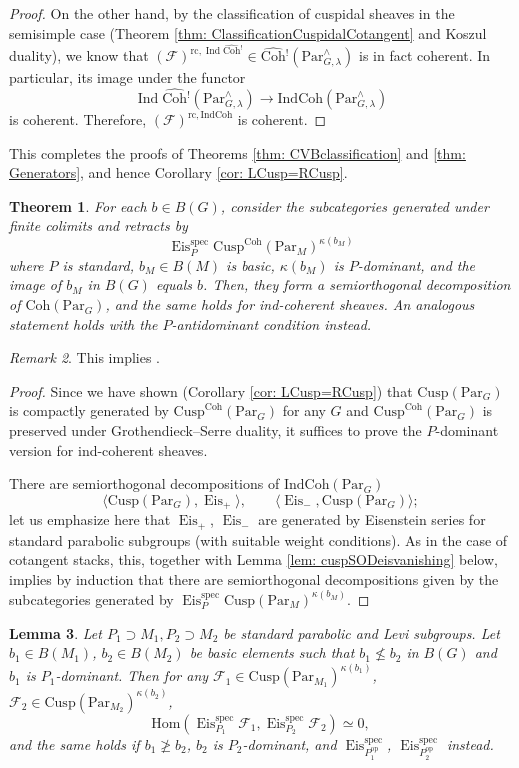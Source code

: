\documentclass{amsart}
\newtheorem{theorem}{Theorem}[subsection]
\newtheorem{lemma}[theorem]{Lemma}
\theoremstyle{definition}
\theoremstyle{remark}
\newtheorem{remark}[theorem]{Remark}
\numberwithin{equation}{section}
\DeclareMathOperator{\Ind}{Ind}
\newcommand{\mc}{\mathcal}
\newcommand{\Hom}{\mathrm{Hom}}
\newcommand{\spec}{\mathrm{spec}}
\newcommand{\op}{\mathrm{op}}
\newcommand{\wh}{\widehat}
\newcommand{\Par}{\mathrm{Par}}
\newcommand{\IndCoh}{\mathrm{IndCoh}}
\DeclareMathOperator{\Eis}{\mathrm{Eis}}
\newcommand{\Coh}{\mathrm{Coh}}
\newcommand{\Cusp}{\mathrm{Cusp}}
\newcommand{\rc}{\mathrm{rc}}
\begin{document}
\begin{proof}
On the other hand, by the classification of cuspidal sheaves in the semisimple case (Theorem \ref{thm: ClassificationCuspidalCotangent} and Koszul duality), we know that $(\mc F)^{\rc, \Ind\wh{\Coh}{}^!} \in \wh{\Coh}{}^! (\Par_{G,\lambda}^\wedge)$ is in fact coherent. In particular, its image under the functor 
\[
\Ind\wh{\Coh}{}^!(\Par_{G,\lambda}^\wedge) \to \IndCoh (\Par_{G,\lambda}^\wedge)
\]
is coherent. Therefore, $(\mc F)^{\rc, \IndCoh}$ is coherent. 
\end{proof}

This completes the proofs of Theorems \ref{thm: CVBclassification} and \ref{thm: Generators}, and hence Corollary \ref{cor: LCusp=RCusp}. 

\begin{theorem}{\label{thm: cuspSOD}}
For each $b\in B(G)$, consider the subcategories generated under finite colimits and retracts by 
\[
\Eis^\spec_P \Cusp^\Coh (\Par_M)^{\kappa(b_M)}
\]
where $P$ is standard, $b_M \in B(M)$ is basic, $\kappa(b_M)$ is $P$-dominant, and the image of $b_M$ in $B(G)$ equals $b$. Then, they form a semiorthogonal decomposition of $\Coh(\Par_G)$, and the same holds for ind-coherent sheaves. An analogous statement holds with the $P$-antidominant condition instead. 
\end{theorem}

\begin{remark}
This implies \cite[Theorem 3.7.1(ii)]{HansenMann}. 
\end{remark}

\begin{proof}
Since we have shown (Corollary \ref{cor: LCusp=RCusp}) that $\Cusp(\Par_G)$ is compactly generated by $\Cusp^\Coh(\Par_G)$ for any $G$ and $\Cusp^\Coh(\Par_G)$ is preserved under Grothendieck--Serre duality, it suffices to prove the $P$-dominant version for ind-coherent sheaves. 

There are semiorthogonal decompositions of $\IndCoh(\Par_G)$
\[
\langle \Cusp(\Par_G), \Eis_+\rangle, \qquad \langle \Eis_-, \Cusp(\Par_G)\rangle;
\]
let us emphasize here that $\Eis_+$, $\Eis_-$ are generated by Eisenstein series for standard parabolic subgroups (with suitable weight conditions). 
As in the case of cotangent stacks, this, together with Lemma \ref{lem: cuspSODeisvanishing} below, implies by induction that there are semiorthogonal decompositions given by the subcategories generated by $\Eis^\spec_{P}\Cusp(\Par_{M})^{\kappa(b_M)}$. 
\end{proof}

\begin{lemma}{\label{lem: cuspSODeisvanishing}}
Let $P_1\supset M_1, P_2\supset M_2$ be standard parabolic and Levi subgroups. Let $b_1\in B(M_1)$, $b_2\in B(M_2)$ be basic elements such that $b_1\not\leq b_2$ in $B(G)$ and $b_1$ is $P_1$-dominant. 
Then for any $\mc F_1\in \Cusp(\Par_{M_1})^{\kappa(b_1)}$, $\mc F_2\in \Cusp(\Par_{M_2})^{\kappa(b_2)}$, 
\[
\Hom(\Eis^\spec_{P_1}\mc F_1, \Eis^\spec_{P_2}\mc F_2)\simeq 0,
\]
and the same holds if $b_1\not\geq b_2$, $b_2$ is $P_2$-dominant, and $\Eis^\spec_{P_1^{\op}}$, $\Eis^\spec_{P_2^{\op}}$ instead. 
\end{lemma}
\end{document}
